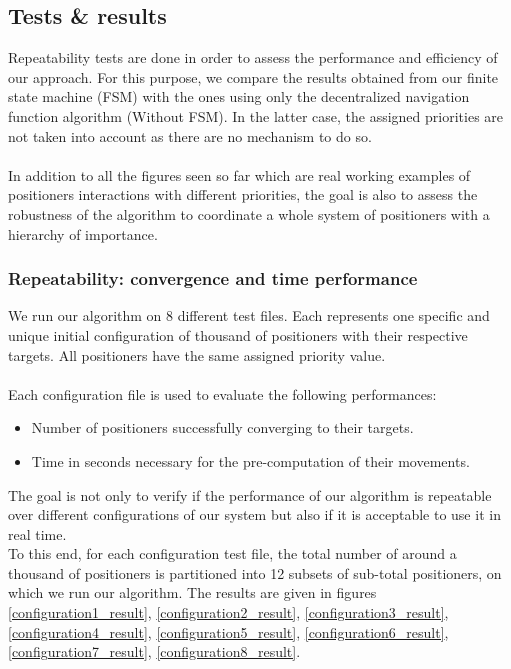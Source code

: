 \documentclass[]{spie}  %
\begin{document}
	\subsection{Tests \& results}
	\label{Test cases}
	
	Repeatability tests are done in order to assess the performance and efficiency of our approach. For this purpose, we compare the results obtained from our finite state machine (FSM) with the ones using only the decentralized navigation function algorithm (Without FSM). In the latter case, the assigned priorities are not taken into account as there are no mechanism to do so.\\\\
	In addition to all the figures seen so far which are real working examples of positioners interactions with different priorities, the goal is also to assess the robustness of the algorithm to coordinate a whole system of positioners with a hierarchy of importance.
	
	\subsubsection{Repeatability: convergence and time performance}
	We run our algorithm on 8 different test files. Each represents one specific and unique initial configuration of thousand of positioners with their respective targets. All positioners have the same assigned priority value.\\\\
	Each configuration file is used to evaluate the following performances: 
	\begin{itemize}
		\item Number of positioners successfully converging to their targets.
		\item Time in seconds necessary for the pre-computation of their movements.
	\end{itemize}
	The goal is not only to verify if the performance of our algorithm is repeatable over different configurations of our system but also if it is acceptable to use it in real time.\\
	To this end, for each configuration test file, the total number of around a thousand of positioners is partitioned into 12 subsets of sub-total positioners, on which we run our algorithm. The results are given in figures \ref{configuration1_result}, \ref{configuration2_result}, \ref{configuration3_result}, \ref{configuration4_result}, \ref{configuration5_result}, \ref{configuration6_result}, \ref{configuration7_result}, \ref{configuration8_result}.
	
\end{document}
